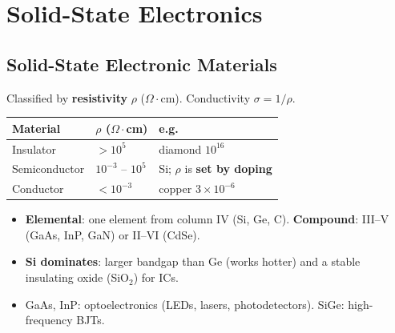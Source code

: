 \section[2]{Solid-State Electronics}

    \subsection[2.1]{Solid-State Electronic Materials}
    Classified by \textbf{resistivity} $\rho$ ($\Omega\cdot$cm). \quad Conductivity $\sigma = 1/\rho$.\\
    \begin{tabularx}{\linewidth}{|l|l|L|}
        \hline
        \textbf{Material} & \textbf{$\rho$ ($\Omega\cdot$cm)} & \textbf{e.g.} \\ \hline
        Insulator & $> 10^{5}$ & diamond $10^{16}$ \\ \hline
        Semiconductor & $10^{-3}$ -- $10^{5}$ & Si; $\rho$ is \textbf{set by doping} \\ \hline
        Conductor & $< 10^{-3}$ & copper $3\times10^{-6}$ \\ \hline
    \end{tabularx}
    \begin{itemize}
        \item \textbf{Elemental}: one element from column IV (Si, Ge, C). \textbf{Compound}: III--V (GaAs, InP, GaN) or II--VI (CdSe).
        \item \textbf{Si dominates}: larger bandgap than Ge (works hotter) and a stable insulating oxide (SiO$_2$) for ICs.
        \item GaAs, InP: optoelectronics (LEDs, lasers, photodetectors). SiGe: high-frequency BJTs.
    \end{itemize}

